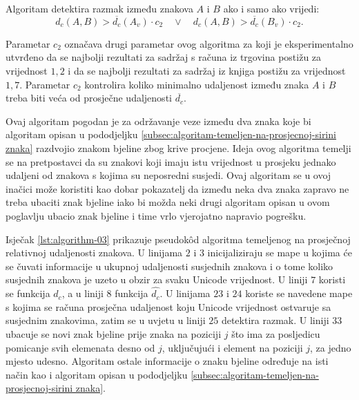 \documentclass[times, utf8, zavrsni]{fer}
\begin{document}
Algoritam detektira razmak između znakova $A$ i $B$ ako i samo ako vrijedi:
\begin{equation}
\label{eq:relative-distance-03}
    d_c(A, B) > \overline{d_c}(A_v) \cdot c_2 \quad \lor \quad
    d_c(A, B) > \overline{d_c}(B_v) \cdot c_2 \texttt{.}
\end{equation}

Parametar $c_2$ označava drugi parametar ovog algoritma za koji je
eksperimentalno utvrđeno da se najbolji rezultati za sadržaj s računa iz
trgovina postižu za vrijednost $1{,}2$ i da se najbolji rezultati za sadržaj iz
knjiga postižu za vrijednost $1{,}7$. Parametar $c_2$ kontrolira koliko
minimalno udaljenost između znaka $A$ i $B$ treba biti veća od prosječne
udaljenosti $\overline{d_c}$.

Ovaj algoritam pogodan je za održavanje veze između dva znaka koje bi
algoritam opisan u pododjeljku
\ref{subsec:algoritam-temeljen-na-prosjecnoj-sirini znaka} razdvojio znakom
bjeline zbog krive procjene. Ideja ovog algoritma temelji se na
pretpostavci da su znakovi koji imaju istu vrijednost u prosjeku jednako
udaljeni od znakova s kojima su neposredni susjedi. Ovaj algoritam se u ovoj
inačici može koristiti kao dobar pokazatelj da između neka dva znaka zapravo
ne treba ubaciti znak bjeline iako bi možda neki drugi algoritam opisan u ovom
poglavlju ubacio znak bjeline i time vrlo vjerojatno napravio pogrešku.

Isječak \ref{lst:algorithm-03} prikazuje pseudokôd algoritma temeljenog na
prosječnoj relativnoj udaljenosti znakova. U linijama $2$ i $3$ inicijaliziraju
se mape u kojima će se čuvati informacije u ukupnoj udaljenosti susjednih
znakova i o tome koliko susjednih znakova je uzeto u obzir za svaku Unicode
vrijednost. U liniji $7$ koristi se funkcija $d_c$, a u liniji $8$ funkcija
$\hat{d_c}$. U linijama $23$ i $24$ koriste se navedene mape s kojima se računa
prosječna udaljenost koju Unicode vrijednost ostvaruje sa susjednim znakovima,
zatim se u uvjetu u liniji $25$ detektira razmak. U liniji $33$
ubacuje se novi znak bjeline prije znaka na poziciji $j$ što ima za posljedicu
pomicanje svih elemenata desno od $j$, uključujući i element na poziciji $j$,
za jedno mjesto udesno. Algoritam ostale informacije o znaku bjeline
određuje na isti način kao i algoritam opisan u pododjeljku
\ref{subsec:algoritam-temeljen-na-prosjecnoj-sirini znaka}.

\pagebreak
\end{document}
